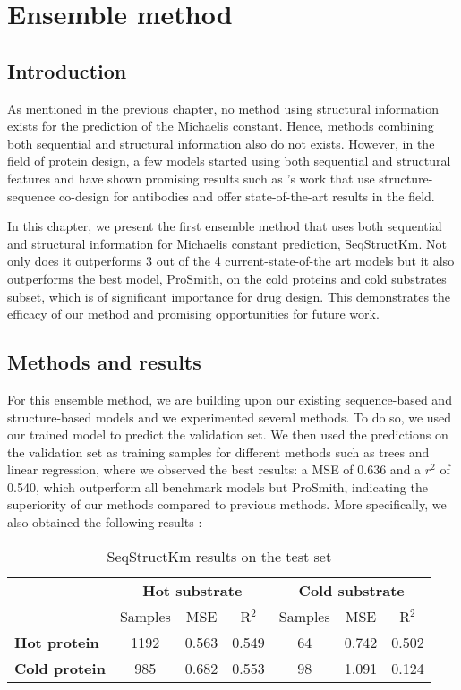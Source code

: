
\chapter{Ensemble method}

\section{Introduction}

As mentioned in the previous chapter, no method using structural information exists for the prediction of the Michaelis constant. Hence, methods combining both sequential and structural information also do not exists. However, in the field of protein design, a few models started using both sequential and structural features and have shown promising results such as \citeauthor{wu2023a}'s work that use structure-sequence co-design for antibodies and offer state-of-the-art results in the field.

In this chapter, we present the first ensemble method that uses both sequential and structural information for Michaelis constant prediction, SeqStructKm. Not only does it outperforms 3 out of the 4 current-state-of-the art models but it also outperforms the best model, ProSmith, on the cold proteins and cold substrates subset, which is of significant importance for drug design. This demonstrates the efficacy of our method and promising opportunities for future work.

\section{Methods and results}

For this ensemble method, we are building upon our existing sequence-based and structure-based models and we
experimented several methods. To do so, we used our trained model to predict the validation set. We then used
the predictions on the validation set as training samples for different methods such as trees and linear
regression, where we observed the best results: a MSE of 0.636 and a $r^2$ of 0.540, which outperform all benchmark models but ProSmith, indicating the superiority of our methods compared to previous methods. More specifically, we also obtained the following results :

\begin{table}[ht]
  \centering
  \begin{tabular}{lcccccc}
  \hline
   & \multicolumn{3}{c}{\textbf{Hot substrate}} & \multicolumn{3}{c}{\textbf{Cold substrate}} \\
   & Samples & MSE & R\(^2\) & Samples & MSE & R\(^2\) \\ \hline
  \textbf{Hot protein}  & 1192 & 0.563 & 0.549 & 64 & 0.742 & 0.502 \\
  \textbf{Cold protein} & 985 & 0.682 & 0.553 & 98 & 1.091 & 0.124 \\ \hline
  \end{tabular}
  \caption{SeqStructKm results on the test set}
  \label{tab:summary_performance}
\end{table}


